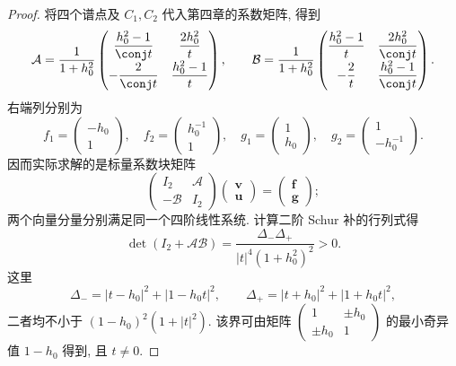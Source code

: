 \begin{proof}
将四个谱点及 $C_1,C_2$ 代入第四章的系数矩阵, 得到
\begin{equation}\label{eq:one-AB}
\mathcal A=\dfrac{1}{1+h_0^2}
\begin{pmatrix}
\dfrac{h_0^2-1}{\conj t}&\dfrac{2h_0^2}{t}\\
-\dfrac{2}{\conj t}&\dfrac{h_0^2-1}{t}
\end{pmatrix},\qquad
\mathcal B=\dfrac{1}{1+h_0^2}
\begin{pmatrix}
\dfrac{h_0^2-1}{t}&\dfrac{2h_0^2}{\conj t}\\
-\dfrac{2}{t}&\dfrac{h_0^2-1}{\conj t}
\end{pmatrix}.
\end{equation}
右端列分别为
\[
f_1=\begin{pmatrix}-h_0\\1\end{pmatrix},\quad
f_2=\begin{pmatrix}h_0^{-1}\\1\end{pmatrix},\quad
g_1=\begin{pmatrix}1\\h_0\end{pmatrix},\quad
g_2=\begin{pmatrix}1\\-h_0^{-1}\end{pmatrix}.
\]
因而实际求解的是标量系数块矩阵
\[
\begin{pmatrix}I_2&\mathcal A\\-\mathcal B&I_2\end{pmatrix}
\begin{pmatrix}\boldsymbol v\\\boldsymbol u\end{pmatrix}
=\begin{pmatrix}\boldsymbol f\\\boldsymbol g\end{pmatrix};
\]
两个向量分量分别满足同一个四阶线性系统. 计算二阶 Schur 补的行列式得
\begin{equation}\label{eq:one-schur-det}
\det(I_2+\mathcal A\mathcal B)
=\dfrac{\Delta_-\Delta_+}{|t|^4(1+h_0^2)^2}>0.
\end{equation}
这里
\[
\Delta_-=|t-h_0|^2+|1-h_0t|^2,\qquad
\Delta_+=|t+h_0|^2+|1+h_0t|^2,
\]
二者均不小于 $(1-h_0)^2(1+|t|^2)$. 该界可由矩阵
$\left(\begin{smallmatrix}1&\pm h_0\\\pm h_0&1\end{smallmatrix}\right)$ 的最小奇异值 $1-h_0$ 得到, 且 $t\ne0$.


\end{proof}
